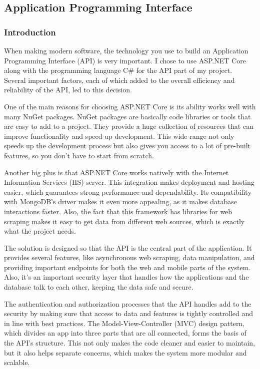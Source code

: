 \newpage

\subsection{Application Programming Interface}

\subsubsection{Introduction}

When making modern software, the technology you use to build an Application Programming Interface (API) is very important. I chose to use ASP.NET Core along with the programming language C\# for the API part of my project. Several important factors, each of which added to the overall efficiency and reliability of the API, led to this decision.

One of the main reasons for choosing ASP.NET Core is its ability works well with many NuGet packages. NuGet packages are basically code libraries or tools that are easy to add to a project. They provide a huge collection of resources that can improve functionality and speed up development. This wide range not only speeds up the development process but also gives you access to a lot of pre-built features, so you don't have to start from scratch.

Another big plus is that ASP.NET Core works natively with the Internet Information Services (IIS) server. This integration makes deployment and hosting easier, which guarantees strong performance and dependability. Its compatibility with MongoDB's driver makes it even more appealing, as it makes database interactions faster. Also, the fact that this framework has libraries for web scraping makes it easy to get data from different web sources, which is exactly what the project needs.
\newline\cite{aspnet}

The solution is designed so that the API is the central part of the application. It provides several features, like asynchronous web scraping, data manipulation, and providing important endpoints for both the web and mobile parts of the system. Also, it's an important security layer that handles how the applications and the database talk to each other, keeping the data safe and secure.

The authentication and authorization processes that the API handles add to the security by making sure that access to data and features is tightly controlled and in line with best practices. The Model-View-Controller (MVC) design pattern, which divides an app into three parts that are all connected, forms the basis of the API's structure. This not only makes the code cleaner and easier to maintain, but it also helps separate concerns, which makes the system more modular and scalable.

